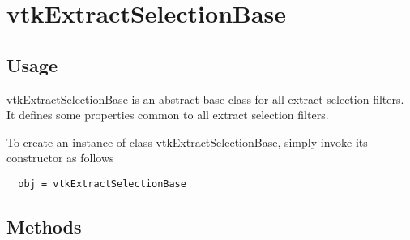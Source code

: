 \section{vtkExtractSelectionBase}

\subsection{Usage}

 vtkExtractSelectionBase is an abstract base class for all extract selection
 filters. It defines some properties common to all extract selection filters.

To create an instance of class vtkExtractSelectionBase, simply
invoke its constructor as follows
\begin{verbatim}
  obj = vtkExtractSelectionBase
\end{verbatim}
\subsection{Methods}

